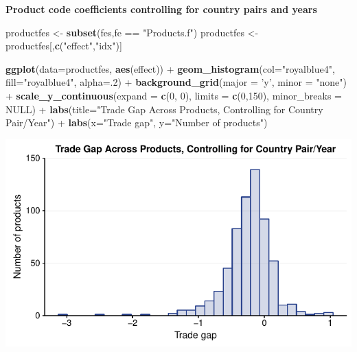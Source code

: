 \documentclass[10pt,]{article}
\newenvironment{Shaded}{\begin{snugshade}}{\end{snugshade}}
\newcommand{\KeywordTok}[1]{\textcolor[rgb]{0.13,0.29,0.53}{\textbf{{#1}}}}
\newcommand{\DataTypeTok}[1]{\textcolor[rgb]{0.13,0.29,0.53}{{#1}}}
\newcommand{\DecValTok}[1]{\textcolor[rgb]{0.00,0.00,0.81}{{#1}}}
\newcommand{\StringTok}[1]{\textcolor[rgb]{0.31,0.60,0.02}{{#1}}}
\newcommand{\OtherTok}[1]{\textcolor[rgb]{0.56,0.35,0.01}{{#1}}}
\newcommand{\NormalTok}[1]{{#1}}
\begin{document}
\textbf{Product code coefficients controlling for country pairs and
years}

\begin{Shaded}
\begin{Highlighting}[]
\NormalTok{productfes <-}\StringTok{ }\KeywordTok{subset}\NormalTok{(fes,fe ==}\StringTok{ "Products.f"}\NormalTok{)}
\NormalTok{productfes <-}\StringTok{ }\NormalTok{productfes[,}\KeywordTok{c}\NormalTok{(}\StringTok{"effect"}\NormalTok{,}\StringTok{"idx"}\NormalTok{)]}

\KeywordTok{ggplot}\NormalTok{(}\DataTypeTok{data=}\NormalTok{productfes, }\KeywordTok{aes}\NormalTok{(effect)) +}
\StringTok{  }\KeywordTok{geom_histogram}\NormalTok{(}\DataTypeTok{col=}\StringTok{"royalblue4"}\NormalTok{,}
                 \DataTypeTok{fill=}\StringTok{"royalblue4"}\NormalTok{,}
                 \DataTypeTok{alpha=}\NormalTok{.}\DecValTok{2}\NormalTok{) +}
\StringTok{  }\KeywordTok{background_grid}\NormalTok{(}\DataTypeTok{major =} \StringTok{'y'}\NormalTok{, }\DataTypeTok{minor =} \StringTok{"none"}\NormalTok{) +}
\StringTok{  }\KeywordTok{scale_y_continuous}\NormalTok{(}\DataTypeTok{expand =} \KeywordTok{c}\NormalTok{(}\DecValTok{0}\NormalTok{, }\DecValTok{0}\NormalTok{), }\DataTypeTok{limits =} \KeywordTok{c}\NormalTok{(}\DecValTok{0}\NormalTok{,}\DecValTok{150}\NormalTok{), }\DataTypeTok{minor_breaks =} \OtherTok{NULL}\NormalTok{) +}
\StringTok{  }\KeywordTok{labs}\NormalTok{(}\DataTypeTok{title=}\StringTok{"Trade Gap Across Products, Controlling for Country Pair/Year"}\NormalTok{) +}
\StringTok{  }\KeywordTok{labs}\NormalTok{(}\DataTypeTok{x=}\StringTok{"Trade gap"}\NormalTok{, }\DataTypeTok{y=}\StringTok{"Number of products"}\NormalTok{)}
\end{Highlighting}
\end{Shaded}

\begin{center}\includegraphics{Figs/value_products_reg-1} \end{center}
\end{document}
